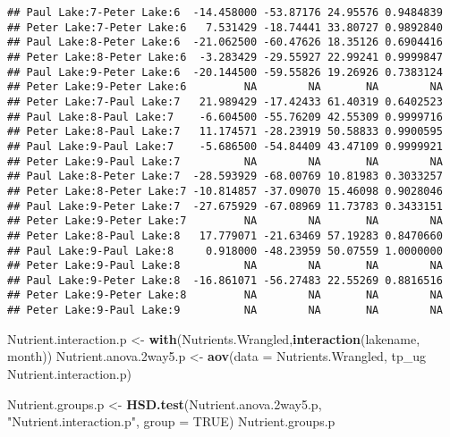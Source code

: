 \documentclass[]{article}
\newenvironment{Shaded}{\begin{snugshade}}{\end{snugshade}}
\newcommand{\DataTypeTok}[1]{\textcolor[rgb]{0.13,0.29,0.53}{#1}}
\newcommand{\FloatTok}[1]{\textcolor[rgb]{0.00,0.00,0.81}{#1}}
\newcommand{\KeywordTok}[1]{\textcolor[rgb]{0.13,0.29,0.53}{\textbf{#1}}}
\newcommand{\NormalTok}[1]{#1}
\newcommand{\OperatorTok}[1]{\textcolor[rgb]{0.81,0.36,0.00}{\textbf{#1}}}
\newcommand{\OtherTok}[1]{\textcolor[rgb]{0.56,0.35,0.01}{#1}}
\newcommand{\StringTok}[1]{\textcolor[rgb]{0.31,0.60,0.02}{#1}}
\begin{document}
\begin{verbatim}
## Paul Lake:7-Peter Lake:6  -14.458000 -53.87176 24.95576 0.9484839
## Peter Lake:7-Peter Lake:6   7.531429 -18.74441 33.80727 0.9892840
## Paul Lake:8-Peter Lake:6  -21.062500 -60.47626 18.35126 0.6904416
## Peter Lake:8-Peter Lake:6  -3.283429 -29.55927 22.99241 0.9999847
## Paul Lake:9-Peter Lake:6  -20.144500 -59.55826 19.26926 0.7383124
## Peter Lake:9-Peter Lake:6         NA        NA       NA        NA
## Peter Lake:7-Paul Lake:7   21.989429 -17.42433 61.40319 0.6402523
## Paul Lake:8-Paul Lake:7    -6.604500 -55.76209 42.55309 0.9999716
## Peter Lake:8-Paul Lake:7   11.174571 -28.23919 50.58833 0.9900595
## Paul Lake:9-Paul Lake:7    -5.686500 -54.84409 43.47109 0.9999921
## Peter Lake:9-Paul Lake:7          NA        NA       NA        NA
## Paul Lake:8-Peter Lake:7  -28.593929 -68.00769 10.81983 0.3033257
## Peter Lake:8-Peter Lake:7 -10.814857 -37.09070 15.46098 0.9028046
## Paul Lake:9-Peter Lake:7  -27.675929 -67.08969 11.73783 0.3433151
## Peter Lake:9-Peter Lake:7         NA        NA       NA        NA
## Peter Lake:8-Paul Lake:8   17.779071 -21.63469 57.19283 0.8470660
## Paul Lake:9-Paul Lake:8     0.918000 -48.23959 50.07559 1.0000000
## Peter Lake:9-Paul Lake:8          NA        NA       NA        NA
## Paul Lake:9-Peter Lake:8  -16.861071 -56.27483 22.55269 0.8816516
## Peter Lake:9-Peter Lake:8         NA        NA       NA        NA
## Peter Lake:9-Paul Lake:9          NA        NA       NA        NA
\end{verbatim}

\begin{Shaded}
\begin{Highlighting}[]
\NormalTok{Nutrient.interaction.p <-}\StringTok{ }\KeywordTok{with}\NormalTok{(Nutrients.Wrangled,}\KeywordTok{interaction}\NormalTok{(lakename, month))}
\NormalTok{Nutrient.anova}\FloatTok{.2}\NormalTok{way5.p <-}\StringTok{ }\KeywordTok{aov}\NormalTok{(}\DataTypeTok{data =}\NormalTok{ Nutrients.Wrangled, tp_ug }\OperatorTok{~}\StringTok{ }\NormalTok{Nutrient.interaction.p)}

\NormalTok{Nutrient.groups.p <-}\StringTok{ }\KeywordTok{HSD.test}\NormalTok{(Nutrient.anova}\FloatTok{.2}\NormalTok{way5.p, }\StringTok{"Nutrient.interaction.p"}\NormalTok{, }\DataTypeTok{group =} \OtherTok{TRUE}\NormalTok{)}
\NormalTok{Nutrient.groups.p}
\end{Highlighting}
\end{Shaded}
\end{document}

